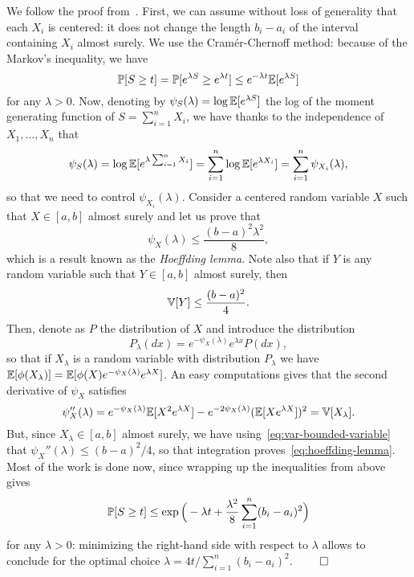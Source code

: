 We follow the proof from~\cite{massart2007concentration}.
First, we can assume without loss of generality that each $X_i$ is centered: it does not change the length $b_i - a_i$ of the interval containing $X_i$ almost surely. 
We use the Cram\'er-Chernoff method: because of the Markov's inequality, we have
\begin{equation*}
	\P[S \geq t] = \P[ e^{\lambda S} \geq e^{\lambda t}] \leq e^{-\lambda t} \E [e^{\lambda S}]
\end{equation*}
for any $\lambda  > 0$.
Now, denoting by $\psi_S(\lambda) = \log \E[e^{\lambda S}]$ the log of the moment generating function of $S = \sum_{i=1}^n X_i$, we have thanks to the independence of $X_1, \ldots, X_n$ that
\begin{equation*}
	\psi_S(\lambda) = \log \E[e^{\lambda \sum_{i=1}^n X_i}] = \sum_{i=1}^n \log \E[e^{\lambda X_i}] = \sum_{i=1}^n \psi_{X_i}(\lambda),
\end{equation*}
so that we need to control $\psi_{X_i}(\lambda)$. Consider a centered random variable $X$ such that $X \in [a, b]$ almost surely and let us prove that
\begin{equation}
	\label{eq:hoeffding-lemma}
	\psi_{X}(\lambda) \leq \frac{(b - a)^2 \lambda^2}{8},
\end{equation}
which is a result known as the \emph{Hoeffding lemma}. 
Note also that if $Y$ is any random variable such that $Y \in [a, b]$ almost surely, then%
\begin{equation}
	\label{eq:var-bounded-variable}
	\var[Y] \leq \frac{(b - a)^2}{4}.
\end{equation}
Then, denote as $P$ the distribution of $X$ and introduce the distribution
\begin{equation*}
	P_\lambda(dx) = e^{-\psi_X(\lambda)} e^{\lambda x} P (dx),
\end{equation*}
so that if $X_\lambda$ is a random variable with distribution $P_\lambda$ we have $\E[\phi(X_\lambda)] = \E[\phi(X) e^{-\psi_X(\lambda)} e^{\lambda X}]$.
An easy computations gives that the second derivative of $\psi_X$ satisfies
\begin{equation*}
	\psi_X''(\lambda) = e^{-\psi_X(\lambda)} \E[X^2 e^{\lambda X}] - e^{-2 \psi_X(\lambda)} (\E[X e^{\lambda X}])^2 = \var[X_\lambda].
\end{equation*}
But, since $X_\lambda \in [a, b]$ almost surely, we have using~\eqref{eq:var-bounded-variable} that $\psi_X''(\lambda) \leq (b - a)^2 / 4$, so that integration proves~\eqref{eq:hoeffding-lemma}.%
Most of the work is done now, since wrapping up the inequalities from above gives
\begin{equation*}
	\P[S \geq t] \leq \exp \Big(-\lambda t + \frac{\lambda^2}{8} \sum_{i=1}^n (b_i - a_i)^2 \Big)
\end{equation*}
for any $\lambda > 0$: minimizing the right-hand side with respect to $\lambda$ allows to conclude for the optimal choice $\lambda = 4 t / \sum_{i=1}^n (b_i - a_i)^2$. $\hfill \qed$

